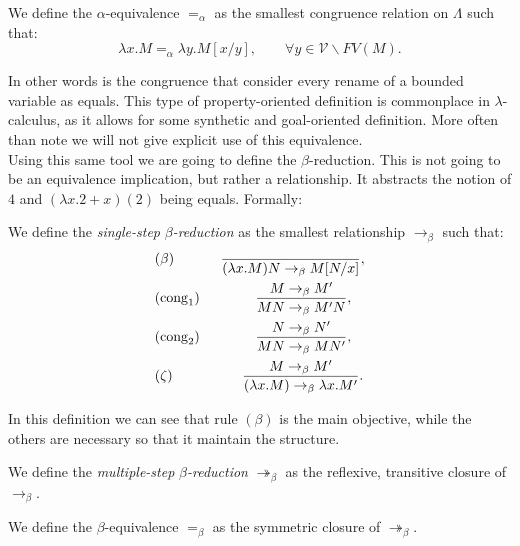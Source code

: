 \begin{definition}
  We define the $\alpha$-equivalence $=_\alpha$ as the smallest congruence relation on $\Lambda$ such that:
  $$\lambda x. M =_\alpha \lambda y. M[x/y], \qquad \forall y \in \mathcal{V} \backslash FV(M).$$
\end{definition}
In other words is the congruence that consider every rename of a bounded variable as equals. This type of property-oriented definition is commonplace in $\lambda$-calculus, as it allows for some synthetic and goal-oriented definition. More often than note we will not give explicit use of this equivalence.\\



Using this same tool we are going to define the $\beta$-reduction. This is not going to be an equivalence implication, but rather a relationship. It abstracts the notion of $4$ and $(\lambda x. 2+x)(2)$ being equals. Formally:

\begin{definition}
  We define the \emph{single-step} $\beta$\emph{-reduction} as the smallest relationship $\to_\beta$ such that:%
  \begin{align*}
    &(\beta) \qquad\ \ \  \ {\ \over(\lambda x.M)N \to_\beta M[N/x]},\\
    &(\operatorname{cong}_1)\qquad\qquad{ M \to_\beta M' \over MN \to_\beta M'N },\\
    &(\operatorname{cong}_2)\qquad\qquad{ N \to_\beta N' \over MN \to_\beta MN' },\\
    &(\zeta) \qquad\qquad \ \  \ {M\to_\beta M' \over(\lambda x.M) \to_\beta \lambda x.M'}.\\
  \end{align*}
\end{definition}

\begin{remark}
  In this definition we can see that rule $(\beta)$ is the main objective, while the others are necessary so that it maintain the structure.
\end{remark}
\begin{definition}
We define the \emph{multiple-step} $\beta$\emph{-reduction} $\twoheadrightarrow_\beta$ as the reflexive, transitive closure of $\to_\beta$.
\end{definition}
\begin{definition}
  We define the $\beta$-equivalence $=_\beta$ as the symmetric closure of $\twoheadrightarrow_\beta$.
\end{definition}

